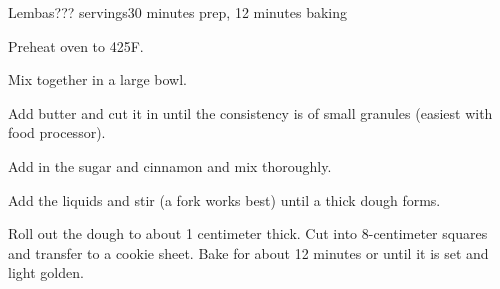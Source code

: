 \documentclass[../Cookbook.tex]{subfiles}
\begin{document}
\begin{recipe}{Lembas}{??? servings}{30 minutes prep, 12 minutes baking}

Preheat oven to 425\0F.

Mix together in a large bowl.

Add butter and cut it in until the consistency is of small granules (easiest with food processor).

Add in the sugar and cinnamon and mix thoroughly.

Add the liquids and stir (a fork works best) until a thick dough forms.

Roll out the dough to about 1 centimeter thick. Cut into 8-centimeter squares and transfer to a cookie sheet. Bake for about 12 minutes or until it is set and light golden.

\end{recipe}
\end{document}
